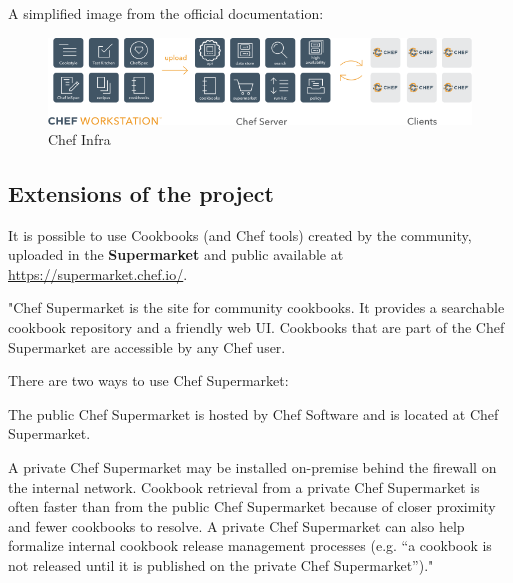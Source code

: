 \documentclass[12pt,a4paper,openright,twoside]{book}
\begin{document}
A simplified image from the official documentation:

\begin{figure}[h]
    \centering
    \includegraphics[width=.8\linewidth]{figures/chef_infra.png}
    \caption{Chef Infra}
    \label{fig:chef-infra-image}
\end{figure}





\subsection{Extensions of the project}
It is possible to use Cookbooks (and Chef tools) created by the community, uploaded in the \textbf{Supermarket} and public available at \url{https://supermarket.chef.io/}.


"Chef Supermarket is the site for community cookbooks. It provides a searchable cookbook repository and a friendly web UI. Cookbooks that are part of the Chef Supermarket are accessible by any Chef user.


There are two ways to use Chef Supermarket:


The public Chef Supermarket is hosted by Chef Software and is located at Chef Supermarket.


A private Chef Supermarket may be installed on-premise behind the firewall on the internal network. Cookbook retrieval from a private Chef Supermarket is often faster than from the public Chef Supermarket because of closer proximity and fewer cookbooks to resolve. A private Chef Supermarket can also help formalize internal cookbook release management processes (e.g. “a cookbook is not released until it is published on the private Chef Supermarket”)."\cite{chefSupermarket}
\end{document}
